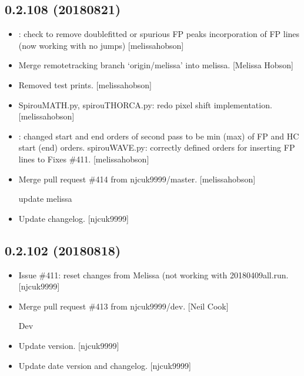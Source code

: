 \documentclass[a4paper,10pt,english]{report}
\begin{document}
\subsection{0.2.108 (2018\sphinxhyphen{}08\sphinxhyphen{}21)}
\label{\detokenize{misc/changelog:id379}}\begin{itemize}
\item {} 
: \sphinxhyphen{} check to remove double\sphinxhyphen{}fitted or
spurious FP peaks \sphinxhyphen{} incorporation of FP lines (now working with no
jumps) {[}melissa\sphinxhyphen{}hobson{]}

\item {} 
Merge remote\sphinxhyphen{}tracking branch ‘origin/melissa’ into melissa. {[}Melissa
Hobson{]}

\item {} 
Removed test prints. {[}melissa\sphinxhyphen{}hobson{]}

\item {} 
SpirouMATH.py, spirouTHORCA.py: redo pixel shift implementation.
{[}melissa\sphinxhyphen{}hobson{]}

\item {} 
: changed start and end orders of second pass to
be min (max) of FP and HC start (end) orders. spirouWAVE.py: correctly
defined orders for inserting FP lines to  Fixes \#411.
{[}melissa\sphinxhyphen{}hobson{]}

\item {} 
Merge pull request \#414 from njcuk9999/master. {[}melissa\sphinxhyphen{}hobson{]}

update melissa

\item {} 
Update changelog. {[}njcuk9999{]}

\end{itemize}


\subsection{0.2.102 (2018\sphinxhyphen{}08\sphinxhyphen{}18)}
\label{\detokenize{misc/changelog:id380}}\begin{itemize}
\item {} 
Issue \#411: reset  changes from Melissa (not working with
 20180409all.run. {[}njcuk9999{]}

\item {} 
Merge pull request \#413 from njcuk9999/dev. {[}Neil Cook{]}

Dev

\item {} 
Update version. {[}njcuk9999{]}

\item {} 
Update date version and changelog. {[}njcuk9999{]}

\end{itemize}
\end{document}
